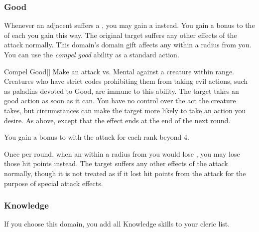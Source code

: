         \subsubsection{Good}
             Whenever an adjacent  suffers a , you may gain a  instead.
            You gain a  bonus to the  of each  you gain this way.
            The original target suffers any other effects of the attack normally.
             This domain's domain gift affects any  within a \areamed radius  from you.
             You can use the \textit{compel good} ability as a standard action.
            \begin{freeability}{Compel Good}[]
                Make an attack vs. Mental against a creature within \rngmed range.
                Creatures who have strict codes prohibiting them from taking evil actions, such as paladins devoted to Good, are immune to this ability.
                \hit The target takes an good action as soon as it can.
                You have no control over the act the creature takes, but circumstances can make the target more likely to take an action you desire.
                \glance As above, except that the effect ends at the end of the next round.

                \rankline
                You gain a  bonus to  with the attack for each rank beyond 4.
            \end{freeability}
             Once per round, when an  within a \areamed radius  from you would lose , you may lose those hit points instead.
            The target suffers any other effects of the attack normally, though it is not treated as if it lost hit points from the attack for the purpose of special attack effects.

        \subsubsection{Knowledge}
            If you choose this domain, you add all Knowledge skills to your cleric  list.

